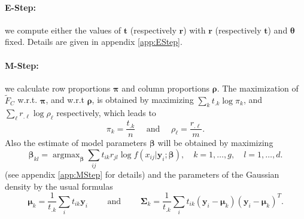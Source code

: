 \documentclass[a4paper]{article}
\newcommand{\br}{\mathbf{r}}
\newcommand{\bt}{\mathbf{t}}
\newcommand{\by}{\mathbf{y}}
\newcommand{\bbeta}{\boldsymbol{\beta}}
\newcommand{\bmu}{\boldsymbol{\mu}}
\newcommand{\bpi}{\boldsymbol{\pi}}
\newcommand{\brho}{\boldsymbol{\rho}}
\newcommand{\bSigma}{\boldsymbol{\Sigma}}
\newcommand{\btheta}{\boldsymbol{\theta}}
\newcommand{\argmax}{\mathop{\mathrm{argmax}}}
\begin{document}
\paragraph{E-Step:} we compute either the values of $\bt$ (respectively $\br$)
with $\br$ (respectively $\bt$) and $\btheta$ fixed. Details are given in
appendix \ref{app:EStep}.
\paragraph{M-Step:} we calculate row proportions $\bpi$ and column proportions $\brho$.
The maximization of $\tilde{F}_C$ w.r.t. $\bpi$, and w.r.t $\brho$, is obtained by maximizing
$\sum_k t_{.k}\log \pi_k $, and $\sum_\ell r_{.\ell}\log \rho_\ell$ respectively, which leads to
\begin{equation}\label{eq:prop-estimate}
\pi_k=\frac{t_{.k}}{n} \quad \textrm{ and } \quad \rho_\ell=\frac{r_{.\ell}}{m}.
\end{equation}
Also the estimate of model parameters $\bbeta$ will be obtained by maximizing
\begin{equation}\label{eq:betakl-estimate}
\bbeta_{kl}= \argmax_{\bbeta}\sum_{ij}t_{ik}r_{jl}\log f(x_{ij}|\by_i;\bbeta),\quad k=1,\ldots,g,\quad l=1,\ldots,d.
\end{equation}
(see appendix \ref{app:MStep} for details) and the parameters of the Gaussian
density by the usual formulas
\begin{equation}\label{eq:gauss-estimate}
\bmu_k = \frac{1}{t_{.k}} \sum_{i} t_{ik} \by_i
\qquad \mbox{ and } \qquad
\bSigma_k = \frac{1}{t_{.k}} \sum_{i} t_{ik} (\by_i -\bmu_{k})(\by_i - \bmu_{k})^T.
\end{equation}
\end{document}
